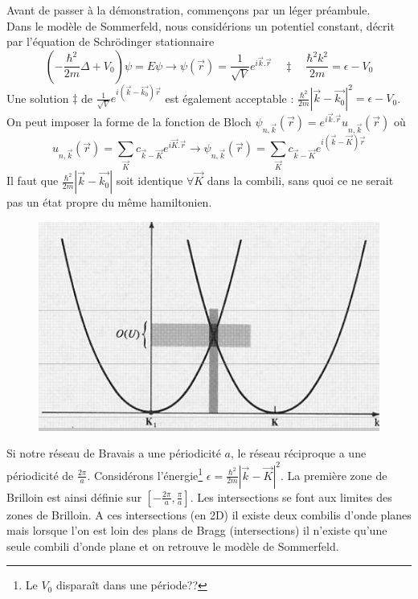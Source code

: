 	Avant de passer à la démonstration, commençons par un léger 
	préambule.\\
	Dans le modèle de Sommerfeld, nous considérions un potentiel 
	constant, décrit par l'équation de Schrödinger stationnaire
	\begin{equation}
	\left(-\frac{\hbar^2}{2m}\Delta + V_0\right)\psi = E\psi 
	\rightarrow \psi(\vec{r}) = \frac{1}{\sqrt{V}}e^{i\vec{k}.\vec{r}}
	\quad \ddagger\quad \frac{\hbar^2 k^2}{2m} = \epsilon-V_0
	\end{equation}
	Une solution $\ddagger$ de $\frac{1}{\sqrt{V}}e^{i(\vec{k}-\vec{k_0})
	\vec{r}}$ est également acceptable : $\frac{\hbar^2}{2m}|\vec{k}-
	\vec{k_0}|^2 = \epsilon-V_0$.\\
	On peut imposer la forme de la fonction de Bloch $\psi_{n,\vec k}(
	\vec{r}) = e^{i\vec{k}.\vec{r}}u_{n,\vec{k}}(\vec{r})$ où
	\begin{equation}
	u_{n,\vec{k}}(\vec{r}) = \sum_{\vec{K}} c_{\vec{k}-\vec{K}}e^{i\vec{K}.
	\vec{r}} \rightarrow \psi_{n,\vec{k}}(\vec{r}) = \sum_{\vec{K}} c_{\vec{k}
	-\vec{K}}e^{i(\vec{k}-\vec{K})\vec{r}}
	\end{equation}
	\danger Il faut que $\frac{\hbar^2}{2m}|\vec{k}-\vec{k_0}|$ soit 
	identique $\forall\vec{K}$ dans la combili, sans quoi ce ne serait 
	pas un état propre du même hamiltonien.\\
		\begin{figure}
	\vspace{-0.5cm}
	\includegraphics[scale=0.4]{ch5/image1.png}
	\end{figure}
	Si notre réseau de Bravais a une périodicité $a$, le réseau 
	réciproque a une périodicité de $\frac{2\pi}{a}$. Considérons 
	l'énergie\footnote{Le $V_0$ disparaît dans une période??} 
	$\epsilon = \frac{\hbar^2}{2m}|\vec{k}-\vec{K}|^2$. La première 
	zone de Brilloin est ainsi définie sur $[-\frac{2\pi}{a},\frac{\pi}{
	a}]$. Les intersections se font aux limites des zones de Brilloin. A 
	ces intersections (en 2D) il existe deux combilis d'onde planes mais 
	lorsque l'on est loin des plans de Bragg (intersections) il n'existe 
	qu'une seule combili d'onde plane et on retrouve le modèle de Sommerfeld.\\
	
